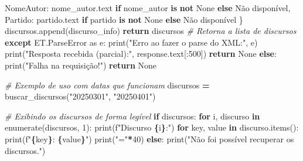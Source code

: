 \documentclass[
]{article}
\newenvironment{Shaded}{\begin{snugshade}}{\end{snugshade}}
\newcommand{\BuiltInTok}[1]{#1}
\newcommand{\CommentTok}[1]{\textcolor[rgb]{0.56,0.35,0.01}{\textit{#1}}}
\newcommand{\ControlFlowTok}[1]{\textcolor[rgb]{0.13,0.29,0.53}{\textbf{#1}}}
\newcommand{\DecValTok}[1]{\textcolor[rgb]{0.00,0.00,0.81}{#1}}
\newcommand{\ImportTok}[1]{#1}
\newcommand{\KeywordTok}[1]{\textcolor[rgb]{0.13,0.29,0.53}{\textbf{#1}}}
\newcommand{\NormalTok}[1]{#1}
\newcommand{\OperatorTok}[1]{\textcolor[rgb]{0.81,0.36,0.00}{\textbf{#1}}}
\newcommand{\SpecialCharTok}[1]{\textcolor[rgb]{0.81,0.36,0.00}{\textbf{#1}}}
\newcommand{\SpecialStringTok}[1]{\textcolor[rgb]{0.31,0.60,0.02}{#1}}
\newcommand{\StringTok}[1]{\textcolor[rgb]{0.31,0.60,0.02}{#1}}
\newcommand{\VariableTok}[1]{\textcolor[rgb]{0.00,0.00,0.00}{#1}}
\begin{document}
\begin{Shaded}
\begin{Highlighting}[]
                    \StringTok{\textquotesingle{}NomeAutor\textquotesingle{}}\NormalTok{: nome\_autor.text }\ControlFlowTok{if}\NormalTok{ nome\_autor }\KeywordTok{is} \KeywordTok{not} \VariableTok{None} \ControlFlowTok{else} \StringTok{\textquotesingle{}Não disponível\textquotesingle{}}\NormalTok{,}
                    \StringTok{\textquotesingle{}Partido\textquotesingle{}}\NormalTok{: partido.text }\ControlFlowTok{if}\NormalTok{ partido }\KeywordTok{is} \KeywordTok{not} \VariableTok{None} \ControlFlowTok{else} \StringTok{\textquotesingle{}Não disponível\textquotesingle{}}
\NormalTok{                \}}
\NormalTok{                discursos.append(discurso\_info)}
            \ControlFlowTok{return}\NormalTok{ discursos  }\CommentTok{\# Retorna a lista de discursos}
        \ControlFlowTok{except}\NormalTok{ ET.ParseError }\ImportTok{as}\NormalTok{ e:}
            \BuiltInTok{print}\NormalTok{(}\StringTok{"Erro ao fazer o parse do XML:"}\NormalTok{, e)}
            \BuiltInTok{print}\NormalTok{(}\StringTok{"Resposta recebida (parcial):"}\NormalTok{, response.text[:}\DecValTok{500}\NormalTok{])}
            \ControlFlowTok{return} \VariableTok{None}
    \ControlFlowTok{else}\NormalTok{:}
        \BuiltInTok{print}\NormalTok{(}\StringTok{"Falha na requisição!"}\NormalTok{)}
        \ControlFlowTok{return} \VariableTok{None}

\CommentTok{\# Exemplo de uso com datas que funcionam}
\NormalTok{discursos }\OperatorTok{=}\NormalTok{ buscar\_discursos(}\StringTok{"20250301"}\NormalTok{, }\StringTok{"20250401"}\NormalTok{)}

\CommentTok{\# Exibindo os discursos de forma legível}
\ControlFlowTok{if}\NormalTok{ discursos:}
    \ControlFlowTok{for}\NormalTok{ i, discurso }\KeywordTok{in} \BuiltInTok{enumerate}\NormalTok{(discursos, }\DecValTok{1}\NormalTok{):}
        \BuiltInTok{print}\NormalTok{(}\SpecialStringTok{f"Discurso }\SpecialCharTok{\{}\NormalTok{i}\SpecialCharTok{\}}\SpecialStringTok{:"}\NormalTok{)}
        \ControlFlowTok{for}\NormalTok{ key, value }\KeywordTok{in}\NormalTok{ discurso.items():}
            \BuiltInTok{print}\NormalTok{(}\SpecialStringTok{f"}\SpecialCharTok{\{}\NormalTok{key}\SpecialCharTok{\}}\SpecialStringTok{: }\SpecialCharTok{\{}\NormalTok{value}\SpecialCharTok{\}}\SpecialStringTok{"}\NormalTok{)}
        \BuiltInTok{print}\NormalTok{(}\StringTok{"="}\OperatorTok{*}\DecValTok{40}\NormalTok{)}
\ControlFlowTok{else}\NormalTok{:}
    \BuiltInTok{print}\NormalTok{(}\StringTok{"Não foi possível recuperar os discursos."}\NormalTok{)}
\end{Highlighting}
\end{Shaded}
\end{document}
